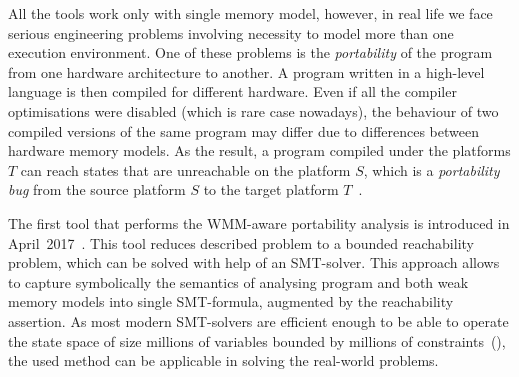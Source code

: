 All the  tools work only with single memory model, however, in real life we face serious engineering problems involving necessity to model more than one execution environment. One of these problems is the \textit{portability} of the program from one hardware architecture to another. A program written in a high-level language is then compiled for different hardware. Even if all the compiler optimisations were disabled (which is rare case nowadays), the behaviour of two compiled versions of the same program may differ due to differences between hardware memory models.
As the result, a program compiled under the platforms $T$ can reach states that are unreachable on the platform $S$, which is a \textit{portability bug} from the source platform $S$ to the target platform $T$~\cite{Porthos17}.

The first tool that performs the WMM-aware portability analysis is \Porthos introduced in April~2017~\cite{Porthos17}. This tool reduces described problem to a bounded reachability problem, which can be solved with help of an SMT-solver. This approach allows to capture symbolically the semantics of analysing program and both weak memory models into single SMT-formula, augmented by the reachability assertion. As most modern SMT-solvers are efficient enough to be able to operate the state space of size millions of variables bounded by millions of constraints~(\cite{malik2009boolean}), the used method can be applicable in solving the real-world problems.



